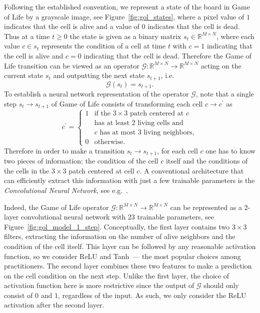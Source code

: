 \documentclass[letterpaper]{article} %
\begin{document}
Following the established convention, we represent a state of the board in Game of Life by a grayscale image, see Figure~\ref{fig:gol_states}, where a pixel value of $1$ indicates that the cell is alive and a value of $0$ indicates that the cell is dead.
Thus at a time $t \ge 0$ the state is given as a binary matrix $s_t \in \mathbb{R}^{M \times N}$, where each value $c \in s_t$ represents the condition of a cell at time $t$ with $c = 1$ indicating that the cell is alive and $c = 0$ indicating that the cell is dead.
Therefore the Game of Life transition can be viewed as an operator $\mathcal{G}: \mathbb{R}^{M \times N} \to \mathbb{R}^{M \times N}$ acting on the current state $s_t$ and outputting the next state $s_{t+1}$, i.e.
\[
    \mathcal{G}(s_t) = s_{t+1}.
\]
To establish a neural network representation of the operator $\mathcal{G}$, note that a single step $s_t \to s_{t+1}$ of Game of Life consists of transforming each cell $c \to c^\prime$ as
\begin{equation}\label{eq:gol_rules}
    c^\prime
    = \left\{\begin{array}{rl}
        1 & \text{if the $3 \times 3$ patch centered at $c$}
            \\
            & \text{has at least $2$ living cells and}
            \\
            & \text{$c$ has at most $3$ living neighbors},
        \\
        0 & \text{otherwise}.
    \end{array}\right.
\end{equation}
Therefore in order to make a transition $s_t \to s_{t+1}$, for each cell $c$ one has to know two pieces of information: the condition of the cell $c$ itself and the conditions of the cells in the $3 \times 3$ patch centered at cell $c$.
A conventional architecture that can efficiently extract this information with just a few trainable parameters is the \textit{Convolutional Neural Network}, see e.g.~\cite{goodfellow2016convolutional}.

Indeed, the Game of Life operator $\mathcal{G}: \mathbb{R}^{M \times N} \to \mathbb{R}^{M \times N}$ can be represented as a 2-layer convolutional neural network with $23$ trainable parameters, see Figure~\ref{fig:gol_model_1_step}.
Conceptually, the first layer contains two $3 \times 3$ filters, extracting the information on the number of alive neighbors and the condition of the cell itself.
This layer can be followed by any reasonable activation function, so we consider ReLU and Tanh~--- the most popular choices among practitioners.
The second layer combines these two features to make a prediction on the cell condition on the next step.
Unlike the first layer, the choice of activation function here is more restrictive since the output of $\mathcal{G}$ should only consist of $0$ and $1$, regardless of the input.
As such, we only consider the ReLU activation after the second layer.
\end{document}
